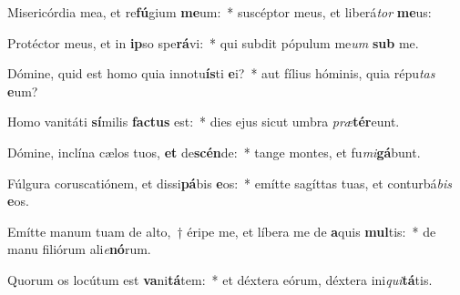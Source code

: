 \item Misericórdia mea, et re\textbf{fú}gium \textbf{me}um:~* suscéptor meus, et liberá\textit{tor} \textbf{me}us:
\item Protéctor meus, et in \textbf{ip}so spe\textbf{rá}vi:~* qui subdit pópulum me\textit{um} \textbf{sub} me.
\item Dómine, quid est homo quia innotu\textbf{ís}ti \textbf{e}i?~* aut fílius hóminis, quia répu\textit{tas} \textbf{e}um?
\item Homo vanitáti \textbf{sí}milis \textbf{fac}\textbf{tus} est:~* dies ejus sicut umbra \textit{præ}\textbf{tér}eunt.
\item Dómine, inclína cælos tuos, \textbf{et} de\textbf{scén}de:~* tange montes, et fu\textit{mi}\textbf{gá}bunt.
\item Fúlgura coruscatiónem, et dissi\textbf{pá}bis \textbf{e}os:~* emítte sagíttas tuas, et conturbá\textit{bis} \textbf{e}os.
\item Emítte manum tuam de alto,~† éripe me, et líbera me de \textbf{a}quis \textbf{mul}tis:~* de manu filiórum ali\textit{e}\textbf{nó}rum.
\item Quorum os locútum est \textbf{va}ni\textbf{tá}tem:~* et déxtera eórum, déxtera ini\textit{qui}\textbf{tá}tis.

